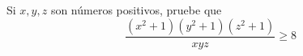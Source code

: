 \item Si $x, y, z$ son números positivos, pruebe que 
    \[ \frac{(x^2 + 1)(y^2 + 1)(z^2 + 1)}{xyz} \ge 8 \]
